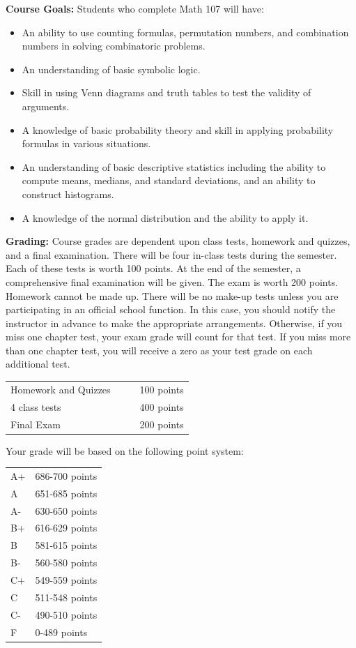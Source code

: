 \documentclass[12pt]{article}
\begin{document}
 \noindent\textbf{Course Goals:}  Students who complete Math 107 will have:
      \begin{itemize}
\item An ability to use counting formulas, permutation numbers, and combination numbers in solving combinatoric problems.
    \item  An understanding of basic symbolic logic.
\item Skill in using Venn diagrams and truth tables to test the validity of arguments.
\item A knowledge of basic probability theory and skill in applying probability formulas in various situations.
\item An understanding of basic descriptive statistics including the ability to compute means, medians, and standard deviations, and an ability to construct histograms.
\item A knowledge of the normal distribution and the ability to apply it.
    \end{itemize}
\vspace{.1 in}

\noindent
\textbf{Grading:}
Course grades are dependent upon class tests, homework and quizzes, and a final examination. There will be four in-class tests during the semester.  Each of these tests is worth 100 points.  At the end of the semester, a comprehensive final examination will be given.  The exam is worth 200 points.  Homework cannot be made up.  There will be no make-up tests unless you are participating in an official school function.  In this case, you should notify the instructor in advance to make the appropriate arrangements.  Otherwise, if you miss one chapter test, your exam grade will count for that test.  If you miss more than one chapter test, you will receive a zero as your test grade on each additional test.



\hspace{1in}
\begin{tabular}[t]{llll}
Homework and Quizzes &&& 100 points \\
4 class tests & & & 400 points \\
Final Exam  & & & 200 points \\
\end{tabular}

\noindent
Your grade will be based on the following point system:

\hspace{1in}
\begin{tabular}[t]{ll}
A+ & 686-700 points \\
A & 651-685 points \\
A- & 630-650 points\\
B+ & 616-629 points\\
B & 581-615 points \\
B- & 560-580 points \\
C+ & 549-559 points \\
C & 511-548 points \\
C- & 490-510 points \\
F & 0-489 points
\end{tabular}
\end{document}
